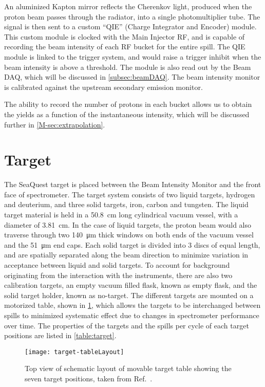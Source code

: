 \documentclass[../main.tex]{subfiles}
\begin{document}
An aluminized Kapton mirror reflects the Cherenkov light, produced when the proton beam
passes through the radiator, into a single photomultiplier tube. The signal is then
sent to a custom ``QIE'' (Charge Integrator and Encoder) module. This custom module
is clocked with the Main Injector RF, and is capable of recording the beam intensity
of each RF bucket for the entire spill. The QIE module is linked to the trigger
system, and would raise a trigger inhibit when the beam intensity is above a
threshold. The module is also read out by the Beam DAQ, which will be discussed
in \cref{subsec:beamDAQ}.
The beam intensity monitor is calibrated against the upstream secondary emission monitor.

The ability to record the number of protons in each bucket allows us to obtain the
yields as a function of the instantaneous intensity, which will be discussed
further in \cref{M-sec:extrapolation}.

\section{Target}
The SeaQuest target is placed between the Beam Intensity Monitor and the front face
of spectrometer. The target system consists of two liquid targets, hydrogen and deuterium,
and three solid targets, iron, carbon and tungsten. The liquid target material is held
in a \SI{50.8}{\cm} long cylindrical vacuum vessel, with a diameter of \SI{3.81}{\cm}.
In the case of liquid targets, the proton beam would also traverse through two
\SI{140}{\um} thick windows on both ends of the vacuum vessel and the \SI{51}{\um} end caps.
Each solid target is divided
into \num{3} discs of equal length, and are spatially separated along the beam
direction to minimize variation in acceptance between liquid and solid targets.
To account for background originating from the interaction with the instruments,
there are also two calibration targets, an empty vacuum filled flask, known as
empty flask, and the solid target holder, known as no-target. The different targets
are mounted on a motorized table, shown in \cref{fig:target}, which allows the
targets to be interchanged between spills to minimized systematic effect due to
changes in spectrometer performance over time. The properties of the targets and the spills per cycle
of each target positions are listed in \cref{table:target}.
\begin{figure}[htbp!]
	\centering
	\texttt{[image: target-tableLayout]}
	\caption{Top view of schematic layout of movable target table showing the seven target positions, taken from Ref.~\cite{aidala2019}.}
	\label{fig:target}
\end{figure}
\end{document}

